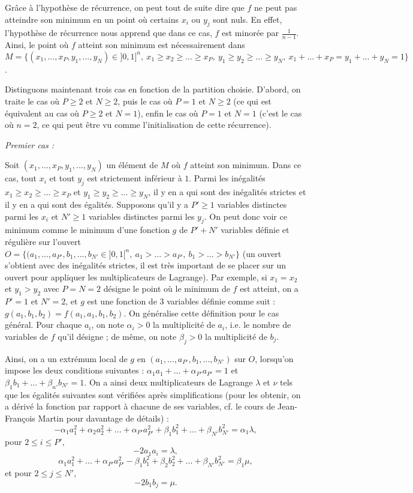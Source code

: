 \begin{sol}
Grâce à l'hypothèse de récurrence, on peut tout de suite dire que $f$ ne peut pas atteindre son minimum en un point où certains $x_i$ ou $y_j$ sont nuls. En effet, l'hypothèse de récurrence nous apprend que dans ce cas, $f$ est minorée par $\frac1{n-1}$. Ainsi, le point où $f$ atteint son minimum est nécessairement dans $M=\{(x_1,...,x_P,y_1,...,y_N) \in ]0,1]^{n},\ x_1 \geq x_2 \geq ... \geq x_P,\ y_1 \geq y_2 \geq ... \geq y_N,\ x_1 + ... + x_P = y_1 + ... + y_N = 1 \}$.

Distinguons maintenant trois cas en fonction de la partition choisie. D'abord, on traite le cas où $P \geq 2$ et $N \geq 2$, puis le cas où $P=1$ et $N \geq 2$ (ce qui est équivalent au cas où $P \geq 2$ et $N=1$), enfin le cas où $P=1$ et $N=1$ (c'est le cas où $n=2$, ce qui peut être vu comme l'initialisation de cette récurrence).

\textit{Premier cas :}

Soit $(x_1,...,x_P,y_1,...,y_N)$ un élément de $M$ où $f$ atteint son minimum. Dans ce cas, tout $x_i$ et tout $y_j$ est strictement inférieur à $1$. Parmi les inégalités $x_1 \geq x_2 \geq ... \geq x_P$ et $y_1 \geq y_2 \geq ... \geq y_N$, il y en a qui sont des inégalités strictes et il y en a qui sont des égalités. Supposons qu'il y a $P' \geq 1$ variables distinctes parmi les $x_i$ et $N' \geq 1$ variables distinctes parmi les $y_j$. On peut donc voir ce minimum comme le minimum d'une fonction $g$ de $P'+N'$ variables définie et régulière sur l'ouvert $O=\{(a_1,...,a_{P'},b_1,...,b_{N'} \in ]0,1[^n,\ a_1>...>a_{P'},\ b_1>...>b_{N'}\}$ (un ouvert s'obtient avec des inégalités strictes, il est très important de se placer sur un ouvert pour appliquer les multiplicateurs de Lagrange). Par exemple, si $x_1=x_2$ et $y_1>y_2$ avec $P=N=2$ désigne le point où le minimum de $f$ est atteint, on a $P'=1$ et $N'=2$, et $g$ est une fonction de $3$ variables définie comme suit : $g(a_1,b_1,b_2)=f(a_1,a_1,b_1,b_2)$. On généralise cette définition pour le cas général. Pour chaque $a_i$, on note $\alpha_i>0$ la multiplicité de $a_i$, i.e. le nombre de variables de $f$ qu'il désigne ; de même, on note $\beta_j>0$ la multiplicité de $b_j$.

Ainsi, on a un extrémum local de $g$ en $(a_1,...,a_{P'},b_1,...,b_{N'})$ sur $O$, lorsqu'on impose les deux conditions suivantes : $\alpha_1 a_1 +...+ \alpha_{P'} a_{P'} =1$ et $\beta_1 b_1 +...+ \beta_{n'} b_{N'} =1$. On a ainsi deux multiplicateurs de Lagrange $\lambda$ et $\nu$ tels que les égalités suivantes sont vérifiées après simplifications (pour les obtenir, on a dérivé la fonction par rapport à chacune de ses variables, cf. le cours de Jean-François Martin pour davantage de détails) :
\[
-\alpha_1 a_1^2 + \alpha_2 a_2^2 +...+ \alpha_{P'} a_{P'}^2 + \beta_1 b_1^2 +...+\beta_{N'} b_{N'}^2 = \alpha_1 \lambda,
\]
pour $2 \leq i \leq P'$,
\[
-2 a_1 a_i = \lambda,
\]
\[
\alpha_1 a_1^2 +...+ \alpha_{P'} a_{P'}^2 -\beta_1 b_1^2 +\beta_2 b_2^2 +...+\beta_{N'} b_{N'}^2 = \beta_1 \mu,
\]
et pour $2 \leq j \leq N'$,
\[
-2 b_1 b_j =\mu.
\]


\end{sol}
